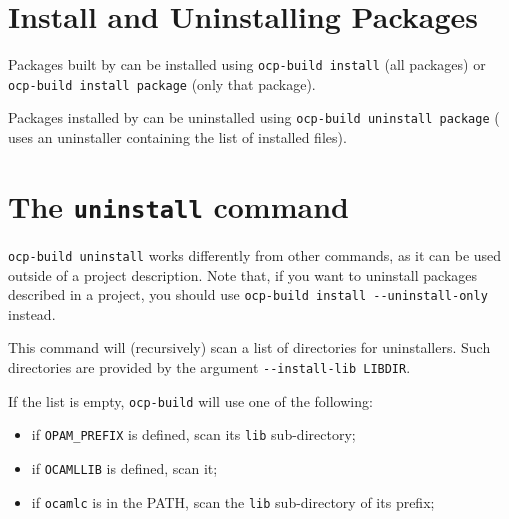 
\section{Install and Uninstalling Packages}

Packages built by \ocpbuild{} can be installed using
\verb|ocp-build install| (all packages) or
\verb|ocp-build install package| (only that package).

Packages installed by \ocpbuild{} can be uninstalled using
\verb|ocp-build uninstall package| (\ocpbuild{} uses an
uninstaller containing the list of installed files).

\section{The {\tt uninstall} command}

\verb|ocp-build uninstall| works differently from other \ocpbuild{}
commands, as it can be used outside of a project description. Note
that, if you want to uninstall packages described in a project, you
should use \verb|ocp-build install --uninstall-only| instead.

This command will (recursively) scan a list of directories
for uninstallers. Such directories are provided by the
argument \verb|--install-lib LIBDIR|.

If the list is empty, \verb|ocp-build| will use one of the
following:
\begin{itemize}
\item if \verb|OPAM_PREFIX| is defined, scan its \verb|lib| sub-directory;
\item if \verb|OCAMLLIB| is defined, scan it;
\item if \verb|ocamlc| is in the PATH, scan the \verb|lib| sub-directory
  of its prefix;
\end{itemize}

